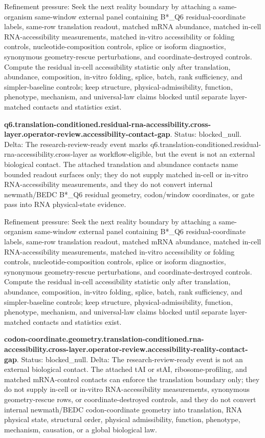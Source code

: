 Refinement pressure: Seek the next reality boundary by attaching a same-organism same-window external panel containing B*\_Q6 residual-coordinate labels, same-row translation readout, matched mRNA abundance, matched in-cell RNA-accessibility measurements, matched in-vitro accessibility or folding controls, nucleotide-composition controls, splice or isoform diagnostics, synonymous geometry-rescue perturbations, and coordinate-destroyed controls. Compute the residual in-cell accessibility statistic only after translation, abundance, composition, in-vitro folding, splice, batch, rank sufficiency, and simpler-baseline controls; keep structure, physical-admissibility, function, phenotype, mechanism, and universal-law claims blocked until separate layer-matched contacts and statistics exist.

\textbf{q6.translation-conditioned.residual-rna-accessibility.cross-layer.operator-review.accessibility-contact-gap}. Status: blocked\_null. Delta: The research-review-ready event marks q6.translation-conditioned.residual-rna-accessibility.cross-layer as workflow-eligible, but the event is not an external biological contact. The attached translation and abundance contacts name bounded readout surfaces only; they do not supply matched in-cell or in-vitro RNA-accessibility measurements, and they do not convert internal newmath/BEDC B*\_Q6 residual geometry, codon/window coordinates, or gate pass into RNA physical-state evidence.

Refinement pressure: Seek the next reality boundary by attaching a same-organism same-window external panel containing B*\_Q6 residual-coordinate labels, same-row translation readout, matched mRNA abundance, matched in-cell RNA-accessibility measurements, matched in-vitro accessibility or folding controls, nucleotide-composition controls, splice or isoform diagnostics, synonymous geometry-rescue perturbations, and coordinate-destroyed controls. Compute the residual in-cell accessibility statistic only after translation, abundance, composition, in-vitro folding, splice, batch, rank sufficiency, and simpler-baseline controls; keep structure, physical-admissibility, function, phenotype, mechanism, and universal-law claims blocked until separate layer-matched contacts and statistics exist.

\textbf{codon-coordinate.geometry.translation-conditioned.rna-accessibility.cross-layer.operator-review.accessibility-reality-contact-gap}. Status: blocked\_null. Delta: The research-review-ready event is not an external biological contact. The attached tAI or stAI, ribosome-profiling, and matched mRNA-control contacts can enforce the translation boundary only; they do not supply in-cell or in-vitro RNA-accessibility measurements, synonymous geometry-rescue rows, or coordinate-destroyed controls, and they do not convert internal newmath/BEDC codon-coordinate geometry into translation, RNA physical state, structural order, physical admissibility, function, phenotype, mechanism, causation, or a global biological law.

